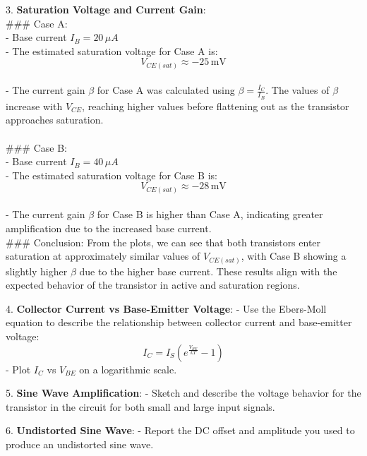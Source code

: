 \documentclass{article}
\begin{document}
3. \textbf{Saturation Voltage and Current Gain}:
\\
### Case A: \\
- Base current \( I_B = 20 \, \mu A \) \\ 
- The estimated saturation voltage for Case A is: \\
  \[
  V_{CE(sat)} \approx -25 \, \text{mV}
  \]
\\
- The current gain \( \beta \) for Case A was calculated using \( \beta = \frac{I_C}{I_B} \). The values of \( \beta \) increase with \( V_{CE} \), reaching higher values before flattening out as the transistor approaches saturation.
\\ \\ 
### Case B: \\ 
- Base current \( I_B = 40 \, \mu A \) \\ 
- The estimated saturation voltage for Case B is: \\
  \[
  V_{CE(sat)} \approx -28 \, \text{mV}
  \]
\\
- The current gain \( \beta \) for Case B is higher than Case A, indicating greater amplification due to the increased base current.
\\
### Conclusion:
From the plots, we can see that both transistors enter saturation at approximately similar values of \( V_{CE(sat)} \), with Case B showing a slightly higher \( \beta \) due to the higher base current. These results align with the expected behavior of the transistor in active and saturation regions.

4. \textbf{Collector Current vs Base-Emitter Voltage}:
   - Use the Ebers-Moll equation to describe the relationship between collector current and base-emitter voltage:
   \[
   I_C = I_S \left( e^{\frac{V_{BE}}{kT}} - 1 \right)
   \]
   - Plot \(I_C\) vs \(V_{BE}\) on a logarithmic scale.

5. \textbf{Sine Wave Amplification}:
   - Sketch and describe the voltage behavior for the transistor in the circuit for both small and large input signals.
   
6. \textbf{Undistorted Sine Wave}:
   - Report the DC offset and amplitude you used to produce an undistorted sine wave.
\end{document}
